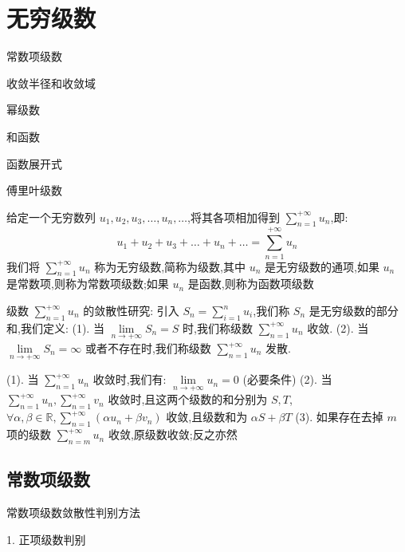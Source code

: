 \chapter{无穷级数}
\begin{introduction}
	\item 常数项级数
	\item 收敛半径和收敛域
	\item 幂级数
	\item 和函数
	\item 函数展开式
	\item 傅里叶级数
\end{introduction}
\begin{definition}
	给定一个无穷数列 $u_{1},u_{2},u_{3},\dots,u_{n},\dots$,将其各项相加得到 $\sum\limits_{n=1}^{+\infty}u_{n}$,即:
	$$u_{1}+u_{2}+u_{3}+\dots+u_{n}+\dots=\sum_{n=1}^{+\infty}u_{n}$$
	我们将 $\sum\limits_{n=1}^{+\infty}u_{n}$ 称为无穷级数,简称为级数,其中 $u_{n}$ 是无穷级数的通项,如果 $u_{n}$ 是常数项,则称为常数项级数;如果 $u_{n}$ 是函数,则称为函数项级数
\end{definition}
\begin{definition}[级数敛散性]
	级数 $\sum\limits_{n=1}^{+\infty}u_{n}$ 的敛散性研究:
	引入 $S_{n}=\sum\limits_{i=1}^{n}u_{i}$,我们称 $S_{n}$ 是无穷级数的部分和,我们定义:
	(1). 当 $\lim\limits_{n\rightarrow +\infty}S_{n}=S$ 时,我们称级数 $\sum\limits_{n=1}^{+\infty}u_{n}$ 收敛.
	(2). 当 $\lim\limits_{n\rightarrow +\infty}S_{n}=\infty$ 或者不存在时,我们称级数 $\sum\limits_{n=1}^{+\infty}u_{n}$ 发散.
\end{definition}
\begin{corollary}
	(1). 当 $\sum\limits_{n=1}^{+\infty}u_{n}$ 收敛时,我们有:  $\lim\limits_{n\rightarrow +\infty}u_{n}=0$ (必要条件)
	(2). 当 $\sum\limits_{n=1}^{+\infty}u_{n},\sum\limits_{n=1}^{+\infty}v_{n}$ 收敛时,且这两个级数的和分别为 $S,T$, $\forall \alpha ,\beta \in \mathbb{R} ,\sum\limits_{n=1}^{+\infty}(\alpha u_{n}+\beta v_{n})$ 收敛,且级数和为 $\alpha S+\beta T$
	(3). 如果存在去掉 $m$ 项的级数 $\sum\limits_{n=m}^{+\infty}u_{n}$ 收敛,原级数收敛;反之亦然
\end{corollary}
\section{常数项级数}

常数项级数敛散性判别方法

1. 正项级数判别

